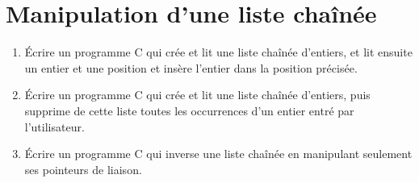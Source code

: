\documentclass[a4paper]{article}
\begin{document}
\section{Manipulation d'une liste chaînée}
\begin{enumerate}
\item Écrire un programme C qui crée et lit une liste chaînée d'entiers, et lit ensuite un entier et une position et insère l'entier dans la position précisée.
\item Écrire un programme C qui crée et lit une liste chaînée d'entiers, puis supprime de cette liste toutes les occurrences d'un entier entré par l'utilisateur.
\item Écrire un programme C qui inverse une liste chaînée en manipulant seulement ses pointeurs de liaison.
\end{enumerate}
\end{document}
